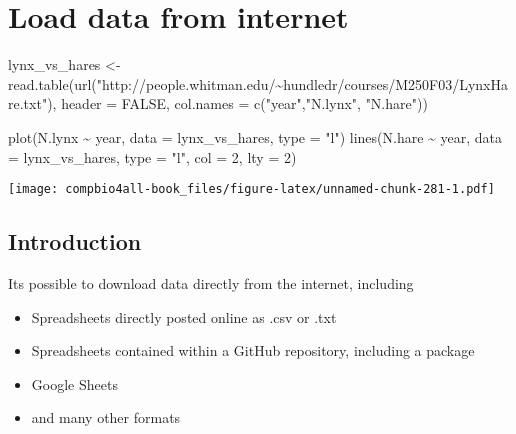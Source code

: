 \documentclass[
]{book}
\newenvironment{Shaded}{\begin{snugshade}}{\end{snugshade}}
\newcommand{\AttributeTok}[1]{\textcolor[rgb]{0.77,0.63,0.00}{#1}}
\newcommand{\ConstantTok}[1]{\textcolor[rgb]{0.00,0.00,0.00}{#1}}
\newcommand{\DecValTok}[1]{\textcolor[rgb]{0.00,0.00,0.81}{#1}}
\newcommand{\FunctionTok}[1]{\textcolor[rgb]{0.00,0.00,0.00}{#1}}
\newcommand{\NormalTok}[1]{#1}
\newcommand{\OtherTok}[1]{\textcolor[rgb]{0.56,0.35,0.01}{#1}}
\newcommand{\SpecialCharTok}[1]{\textcolor[rgb]{0.00,0.00,0.00}{#1}}
\newcommand{\StringTok}[1]{\textcolor[rgb]{0.31,0.60,0.02}{#1}}
\providecommand{\tightlist}{%
  \setlength{\itemsep}{0pt}\setlength{\parskip}{0pt}}
\begin{document}
\hypertarget{load-data-from-internet-1}{%
\chapter{Load data from internet}\label{load-data-from-internet-1}}

\begin{Shaded}
\begin{Highlighting}[]
\NormalTok{lynx\_vs\_hares }\OtherTok{\textless{}{-}} \FunctionTok{read.table}\NormalTok{(}\FunctionTok{url}\NormalTok{(}\StringTok{"http://people.whitman.edu/\textasciitilde{}hundledr/courses/M250F03/LynxHare.txt"}\NormalTok{),}
                            \AttributeTok{header =} \ConstantTok{FALSE}\NormalTok{,}
                            \AttributeTok{col.names =} \FunctionTok{c}\NormalTok{(}\StringTok{"year"}\NormalTok{,}\StringTok{"N.lynx"}\NormalTok{, }\StringTok{"N.hare"}\NormalTok{))}
\end{Highlighting}
\end{Shaded}

\begin{Shaded}
\begin{Highlighting}[]
\FunctionTok{plot}\NormalTok{(N.lynx }\SpecialCharTok{\textasciitilde{}}\NormalTok{ year, }\AttributeTok{data =}\NormalTok{ lynx\_vs\_hares, }\AttributeTok{type =} \StringTok{"l"}\NormalTok{)}
\FunctionTok{lines}\NormalTok{(N.hare }\SpecialCharTok{\textasciitilde{}}\NormalTok{ year, }\AttributeTok{data =}\NormalTok{ lynx\_vs\_hares, }\AttributeTok{type =} \StringTok{"l"}\NormalTok{, }\AttributeTok{col =} \DecValTok{2}\NormalTok{, }\AttributeTok{lty =} \DecValTok{2}\NormalTok{)}
\end{Highlighting}
\end{Shaded}

\texttt{[image: compbio4all-book\_files/figure-latex/unnamed-chunk-281-1.pdf]}

\hypertarget{introduction-2}{%
\section{Introduction}\label{introduction-2}}

Its possible to download data directly from the internet, including

\begin{itemize}
\tightlist
\item
  Spreadsheets directly posted online as .csv or .txt
\item
  Spreadsheets contained within a GitHub repository, including a package
\item
  Google Sheets
\item
  and many other formats
\end{itemize}
\end{document}
